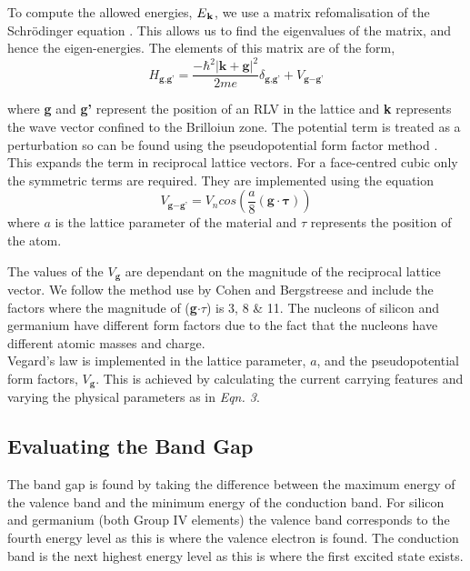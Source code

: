 \documentclass[10pt, twocolumn]{revtex4}    %
\begin{document}
To compute the allowed energies, $E\textsubscript{\textbf{k}}$, we use a matrix refomalisation of  the Schr\"{o}dinger equation \cite{ref09}. This allows us to find the eigenvalues of the matrix, and hence the eigen-energies.
The elements of this matrix are of the form,
\begin{equation}
H_{\textbf{g},\textbf{g'}} = \frac{-\hbar^{2}|\textbf{k} + \textbf{g}|^2}{2me} \delta_{\textbf{g},\textbf{g'}} + 	 V_{\textbf{g} - \textbf{g'}}
\end{equation}

where \textbf{g} and \textbf{g'} represent the position of an RLV in the lattice and \textbf{k} represents the wave vector confined to the Brilloiun zone. The potential term is treated as a perturbation \cite{ref10} so can be found using the pseudopotential form factor method \cite{ref11}. This expands the term in reciprocal lattice vectors. For a face-centred cubic only the symmetric terms are required. They are implemented using the equation
\begin{equation}
V_{\textbf{g} - \textbf{g'}} = V_n cos \left( \frac{a}{8} (\textbf{g} \cdot \mathbf{\tau} )\right)
\end{equation}
where $a$ is the lattice parameter of the material and $\tau$ represents the position of the atom.

The values of the $V_{\textbf{g}}$  are dependant on the magnitude of the reciprocal lattice vector. We follow the method use by Cohen and Bergstreese \cite{ref11} and include the factors where the magnitude of (\textbf{g}$ \cdot \tau$) is 3, 8 \& 11. The nucleons of silicon and germanium have different form factors due to the fact that the nucleons have different atomic masses and charge.\\

Vegard's law is implemented in the lattice parameter, $a$, and the pseudopotential form factors, $V_{\textbf{g}}$. This is achieved by calculating the current carrying features and varying the physical parameters as in \textit{Eqn. 3}.

\subsection{Evaluating the Band Gap}

The band gap is found by taking the difference between the maximum energy of the valence band and the minimum energy of the conduction band. For silicon and germanium (both Group IV elements) the valence band corresponds to the fourth energy level as this is where the valence electron is found. The conduction band is the next highest energy level as this is where the first excited state exists.
\end{document}
